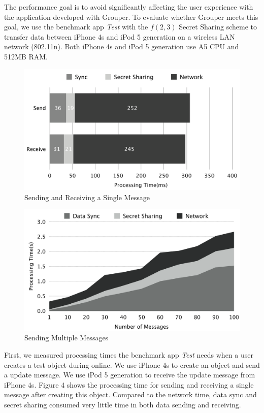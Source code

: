 \documentclass[twocolumn,10pt]{article}
\begin{document}
The performance goal is to avoid significantly affecting the user experience with the application developed with Grouper. 
To evaluate whether Grouper meets this goal, we use the benchmark app \emph{Test} with the $f(2, 3)$ Secret Sharing scheme to transfer data between iPhone 4s and iPod 5 generation on a wireless LAN network (802.11n). 
Both iPhone 4s and iPod 5 generation use A5 CPU and 512MB RAM.

\begin{figure}[t]
	\centering
	\includegraphics[scale=0.12]{processing1}
	\caption{Sending and Receiving a Single Message}
\end{figure}

\begin{figure}[t]
	\centering
	\includegraphics[scale=0.12]{processing2}
	\caption{Sending Multiple Messages}
\end{figure}

First, we measured processing times the benchmark app \emph{Test} needs when a user creates a test object during online. 
We use iPhone 4s to create an object and send a update message. 
We use iPod 5 generation to receive the update message from iPhone 4s.
Figure 4 shows the processing time for sending and receiving a single message after creating this object. 
Compared to the network time, data sync and secret sharing consumed very little time in both data sending and receiving.
\end{document}

